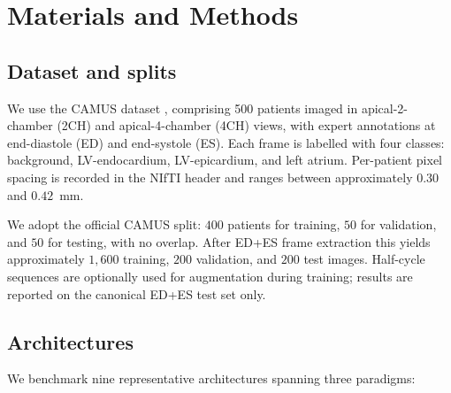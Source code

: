 \section{Materials and Methods}
\label{sec:methods}

\subsection{Dataset and splits}
\label{sec:methods-data}

We use the CAMUS dataset \citep{leclerc2019}, comprising 500 patients
imaged in apical-2-chamber (2CH) and apical-4-chamber (4CH) views, with
expert annotations at end-diastole (ED) and end-systole (ES). Each frame
is labelled with four classes: background, LV-endocardium, LV-epicardium,
and left atrium. Per-patient pixel spacing is recorded in the NIfTI
header and ranges between approximately $0.30$ and $0.42$~mm.

We adopt the official CAMUS split: $400$ patients for training,
$50$ for validation, and $50$ for testing, with no overlap. After
ED+ES frame extraction this yields approximately $1{,}600$ training,
$200$ validation, and $200$ test images. Half-cycle sequences are
optionally used for augmentation during training; results are reported
on the canonical ED+ES test set only.

\subsection{Architectures}
\label{sec:methods-archs}

We benchmark nine representative architectures spanning three paradigms:

